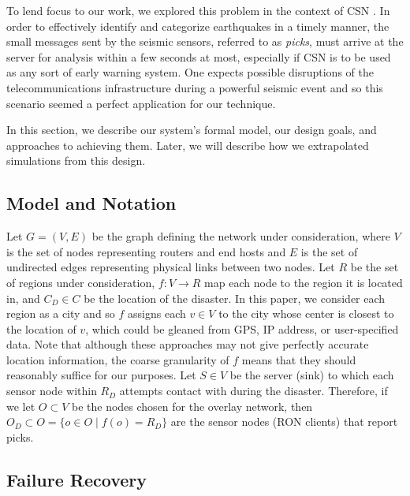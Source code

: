 \documentclass[conference]{IEEEtran}
\begin{document}
To lend focus to our work, we explored this problem in the context of CSN \cite{csn_site}.
In order to effectively identify and categorize earthquakes in a timely manner, the small messages sent by the seismic sensors, referred to as \emph{picks}, must arrive at the server for analysis within a few seconds at most, especially if CSN is to be used as any sort of early warning system.
One expects possible disruptions of the telecommunications infrastructure during a powerful seismic event and so this scenario seemed a perfect application for our technique.

In this section, we describe our system's formal model, our design goals, and approaches to achieving them. %
Later, we will describe how we extrapolated simulations from this design.

\subsection{Model and Notation}
\label{model}

Let $G=(V,E)$ be the graph defining the network under consideration, where $V$ is the set of nodes representing routers and end hosts and $E$ is the set of undirected edges representing physical links between two nodes.
Let $R$ be the set of regions under consideration, $f : V \rightarrow R$ map each node to the region it is located in, and $C_D \in C$ be the location of the disaster.
In this paper, we consider each region as a city and so $f$ assigns each $v \in V$ to the city whose center is closest to the location of $v$, which could be gleaned from GPS, IP address, or user-specified data.
Note that although these approaches may not give perfectly accurate location information, the coarse granularity of $f$ means that they should reasonably suffice for our purposes.
Let $S \in V$ be the server (sink) to which each sensor node within $R_D$ attempts contact with during the disaster.
Therefore, if we let $O \subset V$ be the nodes chosen for the overlay network, then $O_D \subset O = \{o \in O \mid f(o) = R_D\}$ are the sensor nodes (RON clients) that report picks.


\subsection{Failure Recovery}
\label{failure_recovery}
\end{document}
